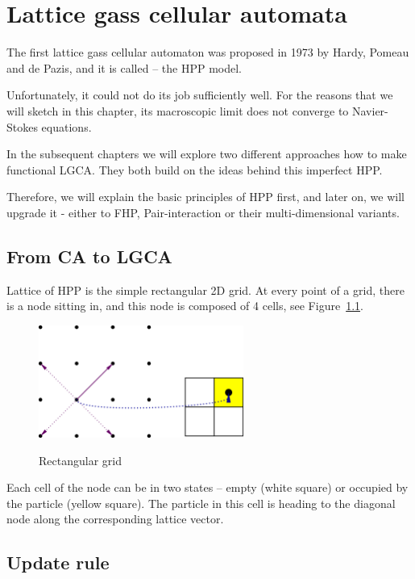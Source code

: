 \chapter{Lattice gass cellular automata}
The first lattice gass cellular automaton was proposed in 1973 by Hardy, Pomeau and de Pazis, and it is called -- the HPP model.

Unfortunately, it could not do its job sufficiently well. For the reasons that we will sketch in this chapter, its macroscopic limit does not converge to Navier-Stokes equations.

\bigskip

In the subsequent chapters we will explore two different approaches how to make functional LGCA. They both build on the ideas behind this imperfect HPP.

Therefore, we will explain the basic principles of HPP first, and later on, we will upgrade it - either to FHP, Pair-interaction or their multi-dimensional variants.

\section{From CA to LGCA}

Lattice of HPP is the simple rectangular 2D grid. At every point of a grid, there is a node sitting in, and this node is composed of 4 cells, see Figure~\ref{rectangular}.

\begin{figure}[htbp]
 \centering
 \includegraphics[width=0.6\textwidth]{./img/hppnode}
 \label{rectangular}
 \caption{Rectangular grid}
\end{figure}

Each cell of the node can be in two states -- empty (white square) or occupied by the particle (yellow square).
The particle in this cell is heading to the diagonal node along the corresponding lattice vector.

\section{Update rule}

